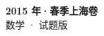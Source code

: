\documentclass[zihao=-4, a4paper]{ctexart}
\begin{document}
\begin{center}
  {\Large\bfseries 2015 年·春季上海卷}\\[4pt]
  {\large 数学 · 试题版}
\end{center}
\medskip
{}

\end{document}
